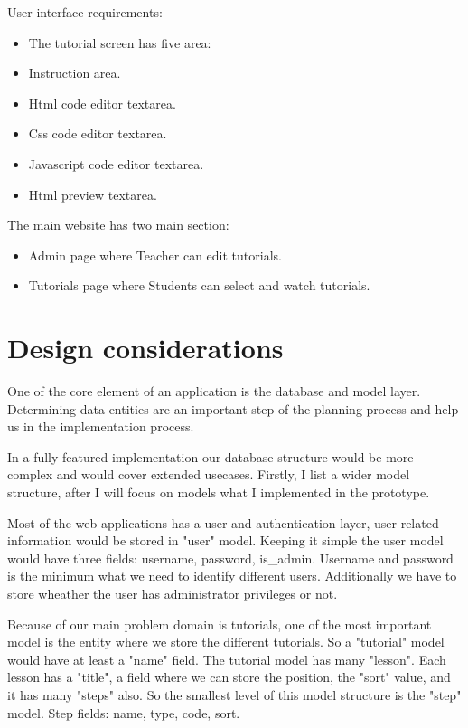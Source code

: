 \documentclass[12pt, a4paper, oneside, openright, medskipamount]{report}
\begin{document}
\noindent User interface requirements:
\begin{itemize}[noitemsep]
\item The tutorial screen has five area:
\item Instruction area.
\item Html code editor textarea.
\item Css code editor textarea.
\item Javascript code editor textarea.
\item Html preview textarea.
\end{itemize}

\noindent The main website has two main section:
\begin{itemize}[noitemsep]
\item Admin page where Teacher can edit tutorials.
\item Tutorials page where Students can select and watch tutorials.
\end{itemize}

\section{Design considerations}

One of the core element of an application is the database and model layer. Determining data entities are an important step of the planning process and help us in the implementation process.

In a fully featured implementation our database structure would be more complex and would cover extended usecases. Firstly, I list a wider model structure, after I will focus on models what I implemented in the prototype.

Most of the web applications has a user and authentication layer, user related information would be stored in "user" model. Keeping it simple the user model would have three fields: username, password, is\_admin. Username and password is the minimum what we need to identify different users. Additionally we have to store wheather the user has administrator privileges or not.

Because of our main problem domain is tutorials, one of the most important model is the entity where we store the different tutorials. So a "tutorial" model would have at least a "name" field. The tutorial model has many "lesson". Each lesson has a "title", a field where we can store the position, the "sort" value, and it has many "steps" also. So the smallest level of this model structure is the "step" model. Step fields: name, type, code, sort.
\end{document}
